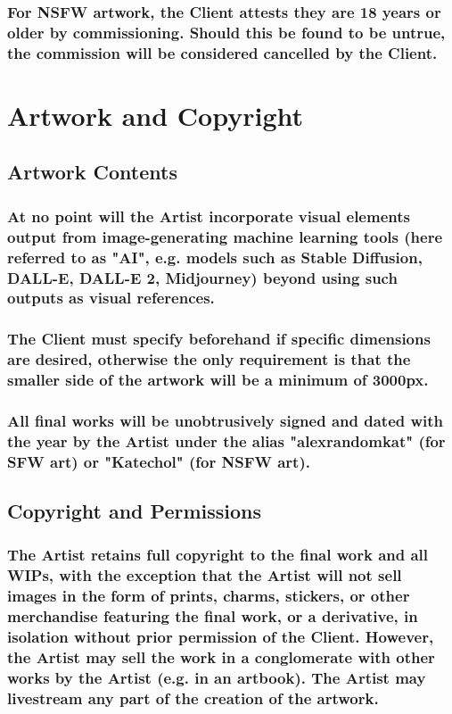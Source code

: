 \documentclass{article}
\begin{document}
\begin{flushleft}
		\subsubsection[Age Restrictions]{\normalfont For NSFW artwork, the Client attests they are 18 years or older by commissioning. Should this be found to be untrue, the commission will be considered cancelled by the Client.}

\leftskip=0cm
\section{Artwork and Copyright}

	\leftskip=1cm
	\subsection{Artwork Contents}

		\leftskip=2cm
		\subsubsection[Artist AI Policy]{\normalfont At no point will the Artist incorporate visual elements output from  image-generating machine learning tools (here referred to as "AI", e.g. models such as Stable Diffusion, DALL-E, DALL-E 2, Midjourney) beyond using such outputs as visual references.}

		\subsubsection[Artwork Dimensions]{\normalfont The Client must specify beforehand if specific dimensions are desired, otherwise the only requirement is that the smaller side of the artwork will be a minimum of 3000px.}

		\subsubsection[Signatures]{\normalfont All final works will be unobtrusively signed and dated with the year by the Artist under the alias "alexrandomkat" (for SFW art) or "Katechol" (for NSFW art).}
	\leftskip=1cm
	\subsection{Copyright and Permissions}
	
		\leftskip=2cm
		\subsubsection[Artist Copyright]{\normalfont The Artist retains full copyright to the final work and all WIPs, with the exception that the Artist will not sell images in the form of prints, charms, stickers, or other merchandise featuring the final work, or a derivative, in isolation without prior permission of the Client. However, the Artist may sell the work in a conglomerate with other works by the Artist (e.g. in an artbook). The Artist may livestream any part of the creation of the artwork.}
		

\end{flushleft}
\end{document}
